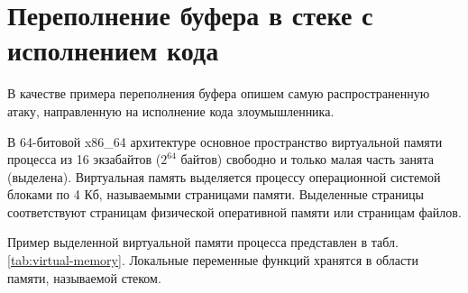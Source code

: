 \section[Переполнение буфера в стеке с исполнением кода]{Переполнение буфера в стеке с \protect\\ исполнением кода}

В качестве примера переполнения буфера опишем самую распространенную атаку, направленную на исполнение кода злоумышленника.

В 64-битовой x86\_64 архитектуре основное пространство виртуальной памяти процесса из 16 экзабайтов ($2^{64}$ байтов) свободно и только малая часть занята (выделена). Виртуальная память выделяется процессу операционной системой блоками по 4 Кб, называемыми страницами памяти. Выделенные страницы соответствуют страницам физической оперативной памяти или страницам файлов.

Пример выделенной виртуальной памяти процесса представлен в табл. \ref{tab:virtual-memory}. Локальные переменные функций хранятся в области памяти, называемой стеком.
\begin{table}[h!]
    \centering
    \caption{Пример структуры виртуальной памяти процесса\label{tab:virtual-memory}}
\end{table}

